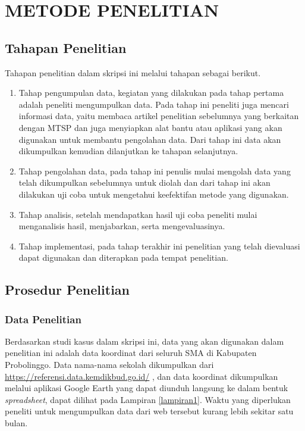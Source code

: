 \chapter{METODE PENELITIAN}

\section{Tahapan Penelitian}

Tahapan penelitian dalam skripsi ini melalui tahapan sebagai berikut.

\begin{enumerate}
	\item Tahap pengumpulan data, kegiatan yang dilakukan pada tahap pertama adalah peneliti mengumpulkan data. Pada tahap ini peneliti juga mencari informasi data, yaitu membaca artikel penelitian sebelumnya yang berkaitan dengan MTSP dan juga menyiapkan alat bantu atau aplikasi yang akan digunakan untuk membantu pengolahan data. Dari tahap ini data akan dikumpulkan kemudian dilanjutkan ke tahapan selanjutnya.
	\item Tahap pengolahan data, pada tahap ini penulis mulai mengolah data yang telah dikumpulkan sebelumnya untuk diolah dan dari tahap ini akan dilakukan uji coba untuk mengetahui keefektifan metode yang digunakan.
	\item Tahap analisis, setelah mendapatkan hasil uji coba peneliti mulai menganalisis hasil, menjabarkan, serta mengevaluasinya.
	\item Tahap implementasi, pada tahap terakhir ini penelitian yang telah dievaluasi dapat digunakan dan diterapkan pada tempat penelitian.
\end{enumerate}

\section{Prosedur Penelitian}


\subsection{Data Penelitian}
    
Berdasarkan studi kasus dalam skripsi ini, data yang akan digunakan dalam penelitian ini adalah data koordinat dari seluruh SMA di Kabupaten Probolinggo. Data nama-nama sekolah dikumpulkan dari \url{https://referensi.data.kemdikbud.go.id/} \cite{kemendikbud}, dan data koordinat dikumpulkan melalui aplikasi Google Earth \cite{googleearth} yang dapat diunduh langsung ke dalam bentuk \textit{spreadsheet}, dapat dilihat pada Lampiran \ref{lampiran1}. Waktu yang diperlukan peneliti untuk mengumpulkan data dari web tersebut kurang lebih sekitar satu bulan.

